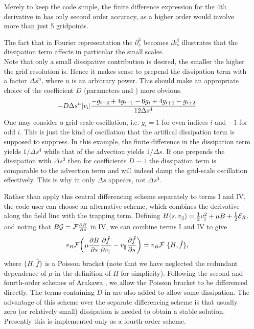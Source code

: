 \ifmoredetails Merely to keep the code simple, the finite difference
expression for the 4th derivative in  has only second
order accuracy, as a higher order would involve more than just 5
gridpoints.

The fact that in Fourier representation the $\partial_s^4$ becomes
$ik_s^4$ illustrates that the dissipation term affects in particular
the small scales.\\
Note that only a small dissipative contribution is desired, the
smaller the higher the grid resolution is. Hence it makes sense to
prepend the dissipation term with a factor $\Delta s^n$, where $n$ is
an arbitrary power. This should make an appropriate choice of the
coefficient $D$ (parameters  and ) more
obvious.
\begin{align}
 - D \Delta s^n\vert v_i \vert {- g_{i-2} + 4 g_{i-1} - 6 g_i + 4 g_{i+1}-g_{i+2} \over 12 \Delta s^4}\nonumber
\end{align}
One may consider a grid-scale oscillation, i.e. $g_{i} = 1$ for even
indices $i$ and $-1$ for odd $i$. This is just the kind of oscillation
that the artifical dissipation term is supposed to suppress.  In this
example, the finite difference in the dissipation term yields
$1/\Delta s^4$ while that of the advection yields $1/\Delta s$.  If
one prepends the dissipation with $\Delta s^3$ then for coefficients
$D \sim 1$ the dissipation term is comparable to the advection term
and will indeed damp the grid-scale oscillation effectively. This is
why in  only $\Delta s$ appears, not $\Delta s^4$.
\fi

Rather than apply this central differencing scheme separately to terms I and IV, the code user can choose an
alternative scheme, which combines the derivative along the field line
with the trapping term. Defining $H(s,v_{\parallel}) = \frac{1}{2} v_{\parallel}^2 + \mu B+\frac{1}{2}{\cal E}_R$, and noting that
$B {\cal G} = {\cal F} {{\partial B}\over{\partial s}}$ in IV, we can combine terms
I and IV to give
\begin{equation}
\label{eq:arakawa}
v_R {\cal F} \bigg( \mu \frac{\partial B}{\partial s}\frac{\partial \hat{f}}{\partial v_{\parallel}}  -
v_{\parallel}\frac{\partial \hat{f}}{\partial s} \bigg) =
v_R {\cal F} ~\{H,\hat{f}\},
\end{equation}
where $\{H,\hat{f}\}$ is a Poisson bracket (note that we have neglected the redundant
dependence of $\mu$ in the definition of $H$ for simplicity). Following the second and
fourth-order schemes of Arakawa \cite{A66}, we allow the Poisson bracket to be
differenced directly. The terms containing $D$ in
 are also added to allow some dissipation. The
advantage of this scheme over the separate differencing scheme is that usually zero (or relatively small) dissipation is
needed to obtain a stable solution. Presently this is implemented only as a fourth-order scheme.

